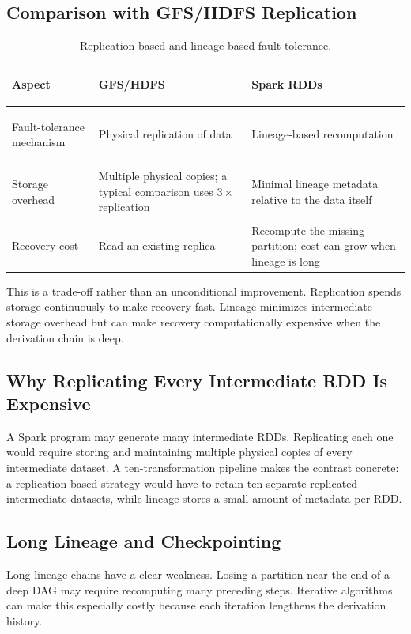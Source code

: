 \documentclass[11pt,a4paper,oneside]{book}
\begin{document}
\subsection{Comparison with GFS/HDFS Replication}

\begin{table}[htbp]
\centering
\caption{Replication-based and lineage-based fault tolerance.}
\label{tab:replication-vs-lineage}
\begin{tabularx}{\textwidth}{>{\bfseries\raggedright\arraybackslash}p{3.6cm} Y Y}
\toprule
{}
Aspect & GFS/HDFS & Spark RDDs \\
\midrule
Fault-tolerance mechanism & Physical replication of data & Lineage-based recomputation \\
Storage overhead & Multiple physical copies; a typical comparison uses $3\times$ replication & Minimal lineage metadata relative to the data itself \\
Recovery cost & Read an existing replica & Recompute the missing partition; cost can grow when lineage is long \\
\bottomrule
\end{tabularx}
\end{table}

This is a trade-off rather than an unconditional improvement. Replication spends storage continuously to make recovery fast. Lineage minimizes intermediate storage overhead but can make recovery computationally expensive when the derivation chain is deep.

\subsection{Why Replicating Every Intermediate RDD Is Expensive}

A Spark program may generate many intermediate RDDs. Replicating each one would require storing and maintaining multiple physical copies of every intermediate dataset. A ten-transformation pipeline makes the contrast concrete: a replication-based strategy would have to retain ten separate replicated intermediate datasets, while lineage stores a small amount of metadata per RDD.

\subsection{Long Lineage and Checkpointing}

Long lineage chains have a clear weakness. Losing a partition near the end of a deep DAG may require recomputing many preceding steps. Iterative algorithms can make this especially costly because each iteration lengthens the derivation history.
\end{document}
